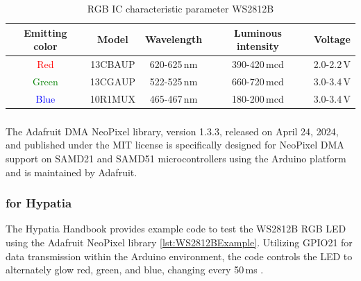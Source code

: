\begin{table}[H]
	\begin{center}
		\caption[RGB IC characteristic parameter WS2812B]{RGB IC characteristic parameter WS2812B \cite[see][3]{Worldsemi:2024}}
		\label{RGBWS2812B}
		\begin{tabular}{|c|c|c|c|c|}
			\hline
			\textbf{Emitting color} & \textbf{Model} & \textbf{Wavelength} & \textbf{Luminous intensity} & \textbf{Voltage}\\
			\hline
			\textcolor{red}{Red} & 13CBAUP & 620-625\,nm & 390-420\,mcd & 2.0-2.2\,V\\
			\hline
			\textcolor{green}{Green} & 13CGAUP & 522-525\,nm & 660-720\,mcd & 3.0-3.4\,V\\
			\hline
			\textcolor{blue}{Blue} & 10R1MUX & 465-467\,nm & 180-200\,mcd & 3.0-3.4\,V\\
			\hline
		\end{tabular}
	\end{center}
\end{table}

\subsubsection{}
The Adafruit DMA NeoPixel library, version 1.3.3, released on April 24, 2024, and published under the MIT license is specifically designed for NeoPixel DMA support on SAMD21 and SAMD51 microcontrollers using the Arduino platform and is maintained by Adafruit. 

\subsubsection{ for Hypatia}

The Hypatia Handbook provides example code to test the WS2812B RGB LED using the Adafruit NeoPixel library \ref{lst:WS2812BExample}. Utilizing GPIO21 for data transmission within the Arduino environment, the code controls the LED to alternately glow red, green, and blue, changing every 50\,ms \cite[see][12]{SYDE:2024}.






